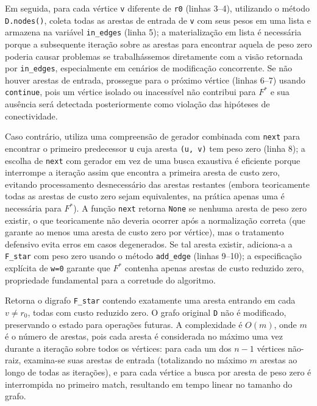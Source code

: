 Em seguida, para cada vértice \texttt{v} diferente de \texttt{r0} (linhas 3--4), utilizando o método \texttt{D.nodes()}, coleta todas as arestas de entrada de \texttt{v} com seus pesos em uma lista e armazena na variável \texttt{in\_edges} (linha 5); a materialização em lista é necessária porque a subsequente iteração sobre as arestas para encontrar aquela de peso zero poderia causar problemas se trabalhássemos diretamente com a visão retornada por \texttt{in\_edges}, especialmente em cenários de modificação concorrente. Se não houver arestas de entrada, prossegue para o próximo vértice (linhas 6--7) usando \texttt{continue}, pois um vértice isolado ou inacessível não contribui para \(F^*\) e sua ausência será detectada posteriormente como violação das hipóteses de conectividade.

Caso contrário, utiliza uma compreensão de gerador combinada com \texttt{next} para encontrar o primeiro predecessor \texttt{u} cuja aresta \texttt{(u, v)} tem peso zero (linha 8); a escolha de \texttt{next} com gerador em vez de uma busca exaustiva é eficiente porque interrompe a iteração assim que encontra a primeira aresta de custo zero, evitando processamento desnecessário das arestas restantes (embora teoricamente todas as arestas de custo zero sejam equivalentes, na prática apenas uma é necessária para \(F^*\)). A função \texttt{next} retorna \texttt{None} se nenhuma aresta de peso zero existir, o que teoricamente não deveria ocorrer após a normalização correta (que garante ao menos uma aresta de custo zero por vértice), mas o tratamento defensivo evita erros em casos degenerados. Se tal aresta existir, adiciona-a a \texttt{F\_star} com peso zero usando o método \texttt{add\_edge} (linhas 9--10); a especificação explícita de \texttt{w=0} garante que \(F^*\) contenha apenas arestas de custo reduzido zero, propriedade fundamental para a corretude do algoritmo.

Retorna o digrafo \texttt{F\_star} contendo exatamente uma aresta entrando em cada \(v\neq r_0\), todas com custo reduzido zero. O grafo original \texttt{D} não é modificado, preservando o estado para operações futuras. A complexidade é \(O(m)\), onde \(m\) é o número de arestas, pois cada aresta é considerada no máximo uma vez durante a iteração sobre todos os vértices: para cada um dos \(n-1\) vértices não-raiz, examina-se suas arestas de entrada (totalizando no máximo \(m\) arestas ao longo de todas as iterações), e para cada vértice a busca por aresta de peso zero é interrompida no primeiro match, resultando em tempo linear no tamanho do grafo.

